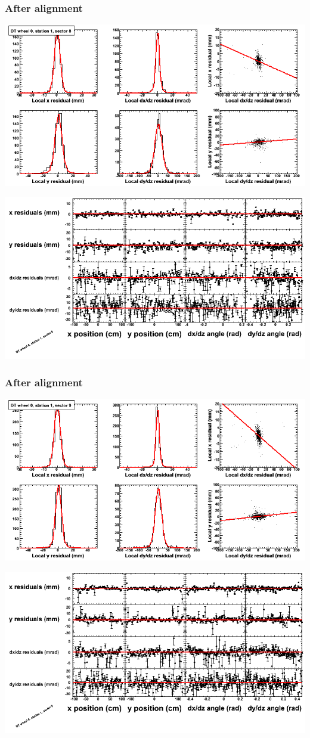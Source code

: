 \documentclass[compress]{beamer}
\begin{document}
\begin{frame}
\frametitle{After alignment}
\includegraphics[width=0.7\linewidth]{NOV4_fitfunctions/MBwhCst1sec08_bellcurves.png}

\includegraphics[width=0.7\linewidth]{NOV4_fitfunctions/MBwhCst1sec08_polynomials.png}
\end{frame}

\begin{frame}
\frametitle{After alignment}
\includegraphics[width=0.7\linewidth]{NOV4_fitfunctions/MBwhCst1sec09_bellcurves.png}

\includegraphics[width=0.7\linewidth]{NOV4_fitfunctions/MBwhCst1sec09_polynomials.png}
\end{frame}
\end{document}
